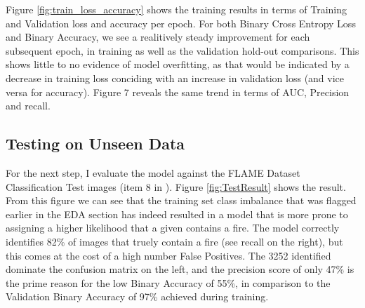 \documentclass[a4paper,11pt]{article} %
\begin{document}
\medskip

Figure \ref{fig:train_loss_accuracy} shows the training results in terms of Training and Validation loss and accuracy per epoch.
For both Binary Cross Entropy Loss and Binary Accuracy, we see a realitively steady improvement for
each subsequent epoch, in training as well as the validation hold-out comparisons. This shows little
to no evidence of model overfitting, as that would be indicated by a decrease in training loss conciding
with an increase in validation loss (and vice versa for accuracy). Figure 7 reveals the same trend in
terms of AUC, Precision and recall.

\subsection{Testing on Unseen Data}
For the next step, I evaluate the model against the FLAME Dataset Classification Test images (item 8 in \cite{FLAME_IEEE}). 
Figure \ref{fig:TestResult} shows the result. From this figure we can see that the training set class imbalance that was flagged
earlier in the EDA section has indeed resulted in a model that is more prone to assigning a higher likelihood that a given contains a
fire. The model correctly identifies 82\% of images that truely contain a fire (see recall on the right), but this comes at the cost of
a high number False Positives. The 3252 identified dominate the confusion matrix on the left, and the precision score of only 47\%
is the prime reason for the low Binary Accuracy of 55\%, in comparison to the Validation Binary Accuracy of 97\% achieved during training.
\end{document}

